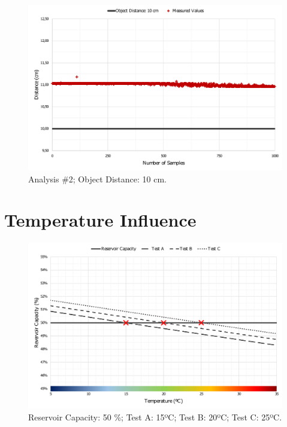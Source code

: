 \begin{figure}[h!]
    \centering
    \includegraphics[scale=0.52]{images/Results/testing_methodology/conf10.pdf}
    \caption{Analysis \#2; Object Distance: 10 cm.}
    \label{fig:conf10}
\end{figure}


\clearpage
\section{Temperature Influence}\label{appendice1:third}


\begin{figure}[h!]
    \centering
    \includegraphics[scale=0.5]{images/Results/temperature_influence/Analyse_50.pdf}
    \caption{Reservoir Capacity: 50 \%; Test A: 15ºC; Test B: 20ºC; Test C: 25ºC.}
    \label{fig:ana50}
\end{figure}


